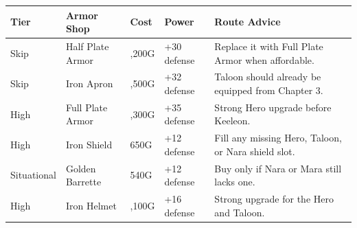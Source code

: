 \documentclass[
  american,
  10pt,
  letterpaper,
  oneside,
  open=any]{scrreprt}
\newcounter{none} %
\newenvironment{guidetable}{%
  \small\setstretch{1.0}%
  \setlength{\tabcolsep}{4pt}%
  \setlength{\LTpre}{8pt}\setlength{\LTpost}{10pt}%
  \renewcommand{\arraystretch}{1.16}%
}{ }
\begin{document}
\begin{guidetable}

{\def\LTcaptype{none} %
\begin{longtable}[]{@{}
  >{\raggedright\arraybackslash}p{}
  >{\raggedright\arraybackslash}p{}
  >{\raggedleft\arraybackslash}p{}
  >{\raggedleft\arraybackslash}p{}
  >{\raggedright\arraybackslash}p{}@{}}
\toprule\noalign{}
\begin{minipage}[b]{\linewidth}\raggedright
\color{GuideGreen}\bfseries Tier
\end{minipage} & \begin{minipage}[b]{\linewidth}\raggedright
\color{GuideGreen}\bfseries Armor Shop
\end{minipage} & \begin{minipage}[b]{\linewidth}\raggedleft
\color{GuideGreen}\bfseries Cost
\end{minipage} & \begin{minipage}[b]{\linewidth}\raggedleft
\color{GuideGreen}\bfseries Power
\end{minipage} & \begin{minipage}[b]{\linewidth}\raggedright
\color{GuideGreen}\bfseries Route Advice
\end{minipage} \\
\midrule\noalign{}
\endhead
\bottomrule\noalign{}
\endlastfoot
Skip & Half Plate Armor & 1,200G & +30 defense & Replace it with Full
Plate Armor when affordable. \\
Skip & Iron Apron & 1,500G & +32 defense & Taloon should already be
equipped from Chapter 3. \\
High & Full Plate Armor & 2,300G & +35 defense & Strong Hero upgrade
before Keeleon. \\
High & Iron Shield & 650G & +12 defense & Fill any missing Hero, Taloon,
or Nara shield slot. \\
Situational & Golden Barrette & 540G & +12 defense & Buy only if Nara or
Mara still lacks one. \\
High & Iron Helmet & 1,100G & +16 defense & Strong upgrade for the Hero
and Taloon. \\
\end{longtable}
}

\end{guidetable}
\end{document}
